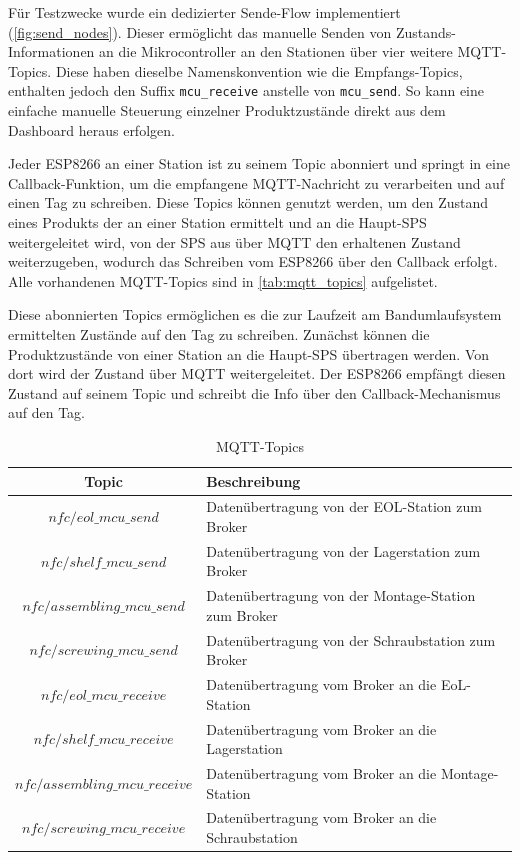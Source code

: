 Für Testzwecke wurde ein dedizierter Sende-Flow implementiert (\autoref{fig:send_nodes}). Dieser ermöglicht das manuelle Senden von Zustands-Informationen an die Mikrocontroller an den Stationen über vier weitere MQTT-Topics. Diese haben dieselbe Namenskonvention wie die Empfangs-Topics, enthalten jedoch den Suffix \texttt{mcu\_receive} anstelle von \texttt{mcu\_send}. So kann eine einfache manuelle Steuerung einzelner Produktzustände direkt aus dem Dashboard heraus erfolgen. 

Jeder ESP8266 an einer Station ist zu seinem Topic abonniert und springt in eine Callback-Funktion, um die empfangene MQTT-Nachricht zu verarbeiten und auf einen Tag zu schreiben. Diese Topics können genutzt werden, um den Zustand eines Produkts der an einer Station ermittelt und an die Haupt-SPS weitergeleitet wird, von der SPS aus über MQTT den erhaltenen Zustand weiterzugeben, wodurch das Schreiben vom ESP8266 über den Callback erfolgt. Alle vorhandenen MQTT-Topics sind in \autoref{tab:mqtt_topics} aufgelistet.

Diese abonnierten Topics ermöglichen es die zur Laufzeit am Bandumlaufsystem ermittelten Zustände auf den Tag zu schreiben. Zunächst können die Produktzustände von einer Station an die Haupt-SPS übertragen werden. Von dort wird der Zustand über MQTT weitergeleitet. Der ESP8266 empfängt diesen Zustand auf seinem Topic und schreibt die Info über den Callback-Mechanismus auf den Tag.

\begin{table}[H]
	\centering
	\caption{MQTT-Topics}
	\label{tab:mqtt_topics}
	\begin{tabular}{|c|l|}
		\hline
		\textbf{Topic} & \textbf{Beschreibung} \\ \hline
		$nfc/eol\_mcu\_send$ & Datenübertragung von der EOL-Station zum Broker \\ 
		$nfc/shelf\_mcu\_send$ & Datenübertragung von der Lagerstation zum Broker \\ 
		$nfc/assembling\_mcu\_send$ & Datenübertragung von der Montage-Station zum Broker \\ 
		$nfc/screwing\_mcu\_send$ & Datenübertragung von der Schraubstation zum Broker \\ \hline
		$nfc/eol\_mcu\_receive$ & Datenübertragung vom Broker an die EoL-Station \\ 
		$nfc/shelf\_mcu\_receive$ & Datenübertragung vom Broker an die Lagerstation\\ 
		$nfc/assembling\_mcu\_receive$ & Datenübertragung vom Broker an die Montage-Station\\ 
		$nfc/screwing\_mcu\_receive$ & Datenübertragung vom Broker an die Schraubstation \\ \hline
	\end{tabular}
\end{table}


